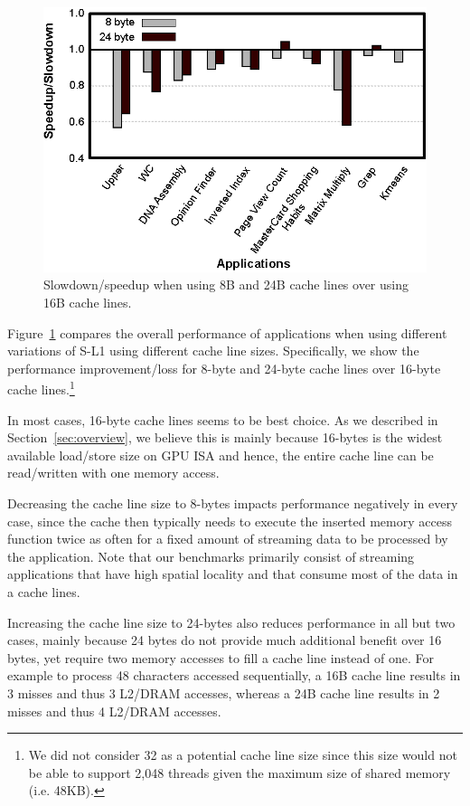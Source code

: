 \begin{figure}[t]
\center
\includegraphics[scale=0.85]{6differentCachelineSizes.eps}
\vspace{-0.1cm}
\caption{\footnotesize\textnormal{Slowdown/speedup when using 8B and 24B cache lines over using 16B cache lines.}}
\label{fig:cachelinesize}
\end{figure}
\vspace{-0.1cm}

Figure~\ref{fig:cachelinesize} compares the overall performance of applications when using different variations of S-L1 using different cache line sizes. 
Specifically, we show the performance improvement/loss for 8-byte and 24-byte cache lines over
16-byte cache lines.\footnote{We did not consider 32 as a potential cache line size since 
    this size would not be able to support 2,048 threads given the maximum size of shared memory  
    (i.e. 48KB).}

In most cases, 16-byte cache lines seems to be best choice. 
As we described in Section~\ref{sec:overview}, we believe this is mainly because 16-bytes is the widest available load/store size on GPU ISA and hence, the entire cache line can be read/written with one memory access.

Decreasing the cache line size to 8-bytes impacts performance negatively in every case, since the cache then typically needs to execute the inserted memory access function twice as often for a fixed amount of streaming data to be processed by the application. 
Note that our benchmarks primarily consist of streaming applications that have high spatial locality and that consume most of the data in a cache lines.

Increasing the cache line size to 24-bytes also reduces performance in all but two cases, mainly
because 24 bytes do not provide much additional benefit over 16 bytes, yet require two memory accesses to fill a cache line instead of one.
For example to process 48 characters accessed sequentially, a 16B cache line results in 3 misses and thus 3 L2/DRAM accesses, whereas a 24B cache line results in 2 misses and thus 4 L2/DRAM accesses.




